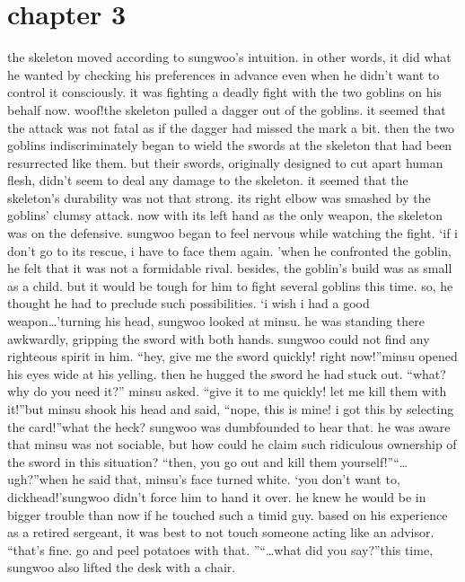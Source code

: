 \section{chapter 3}






the skeleton moved according to sungwoo’s intuition.
 in other words, it did what he wanted by checking his preferences in advance even when he didn’t want to control it consciously.
 it was fighting a deadly fight with the two goblins on his behalf now.
woof!the skeleton pulled a dagger out of the goblins.
 it seemed that the attack was not fatal as if the dagger had missed the mark a bit.
then the two goblins indiscriminately began to wield the swords at the skeleton that had been resurrected like them.
but their swords, originally designed to cut apart human flesh, didn’t seem to deal any damage to the skeleton.
it seemed that the skeleton’s durability was not that strong.
 its right elbow was smashed by the goblins’ clumsy attack.
 now with its left hand as the only weapon, the skeleton was on the defensive.
 sungwoo began to feel nervous while watching the fight.
‘if i don’t go to its rescue, i have to face them again.
’when he confronted the goblin, he felt that it was not a formidable rival.
 besides, the goblin’s build was as small as a child.
 but it would be tough for him to fight several goblins this time.
 so, he thought he had to preclude such possibilities.
‘i wish i had a good weapon…’turning his head, sungwoo looked at minsu.
 he was standing there awkwardly, gripping the sword with both hands.
 sungwoo could not find any righteous spirit in him.
“hey, give me the sword quickly! right now!”minsu opened his eyes wide at his yelling.
 then he hugged the sword he had stuck out.
“what? why do you need it?” minsu asked.
“give it to me quickly! let me kill them with it!”but minsu shook his head and said, “nope, this is mine! i got this by selecting the card!”what the heck? sungwoo was dumbfounded to hear that.
 he was aware that minsu was not sociable, but how could he claim such ridiculous ownership of the sword in this situation?
“then, you go out and kill them yourself!”“…ugh?”when he said that, minsu’s face turned white.
‘you don’t want to, dickhead!’sungwoo didn’t force him to hand it over.
 he knew he would be in bigger trouble than now if he touched such a timid guy.
 based on his experience as a retired sergeant, it was best to not touch someone acting like an advisor.
“that’s fine.
 go and peel potatoes with that.
”“…what did you say?”this time, sungwoo also lifted the desk with a chair.
